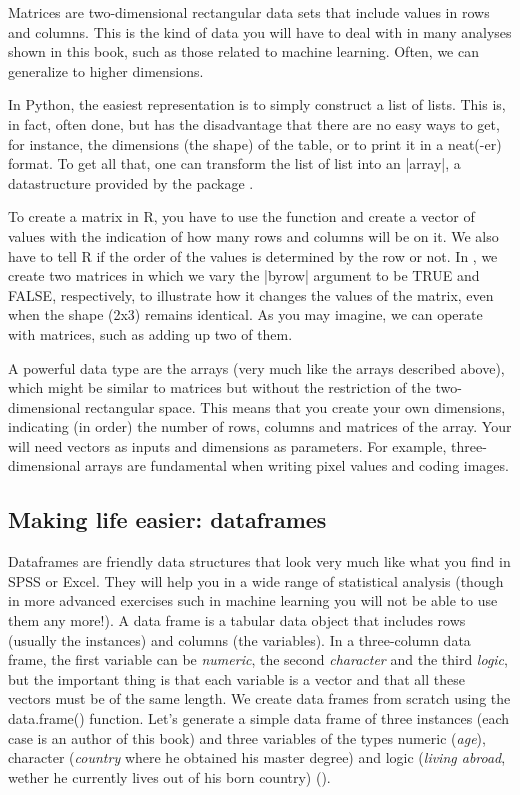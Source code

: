 Matrices are two-dimensional rectangular data sets that include values
in rows and columns. This is the kind of data you will have to deal
with in many analyses shown in this book, such as those related to
machine learning. Often, we can generalize to higher dimensions.


In Python, the easiest representation is to simply construct a list of
lists. This is, in fact, often done, but has the disadvantage that
there are no easy ways to get, for instance, the dimensions (the
shape) of the table, or to print it in a neat(-er) format. To get all
that, one can transform the list of list into an |array|, a
datastructure provided by the package .

To create a matrix in R, you have to use the function  and
create a vector of values with the indication of how many rows and
columns will be on it. We also have to tell R if the order of the
values is determined by the row or not. In , we create
two matrices in which we vary the |byrow| argument to be TRUE and
FALSE, respectively, to illustrate how it changes the values of the
matrix, even when the shape (2x3) remains identical. As you may
imagine, we can operate with matrices, such as adding up two of them.

A powerful data type are the arrays (very much like the 
arrays described above), which might be similar to matrices but
without the restriction of the two-dimensional rectangular space. This
means that you create your own dimensions, indicating (in order) the
number of rows, columns and matrices of the array. Your will need
vectors as inputs and dimensions as parameters. For example,
three-dimensional arrays are fundamental when writing pixel values and
coding images. 


\subsection{Making life easier: dataframes}

Dataframes are friendly data structures that look very much like
what you find in SPSS or Excel. They will help you in a wide
range of statistical analysis (though in more advanced exercises such
in machine learning you will not be able to use them any more!).  A
data frame is a tabular data object that includes rows (usually the
instances) and columns (the variables). In a three-column data frame,
the first variable can be \emph{numeric}, the second \emph{character}
and the third \emph{logic}, but the important thing is that each
variable is a vector and that all these vectors must be of the same
length. We create data frames from scratch using the data.frame()
function.  Let’s generate a simple data frame of three instances (each
case is an author of this book) and three variables of the types
numeric (\emph{age}), character (\emph{country} where he obtained his
master degree) and logic (\emph{living abroad}, wether he currently
lives out of his born country) ().

